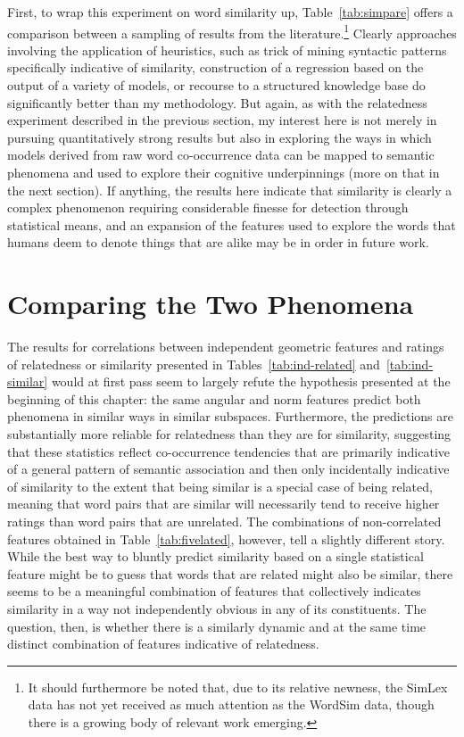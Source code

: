 First, to wrap this experiment on word similarity up, Table~\ref{tab:simpare} offers a comparison between a sampling of results from the literature.\footnote{It should furthermore be noted that, due to its relative newness, the SimLex data has not yet received as much attention as the WordSim data, though there is a growing body of relevant work emerging.}  Clearly approaches involving the application of heuristics, such as  trick of mining syntactic patterns specifically indicative of similarity,  construction of a regression based on the output of a variety of models, or  recourse to a structured knowledge base do significantly better than my methodology.  But again, as with the relatedness experiment described in the previous section, my interest here is not merely in pursuing quantitatively strong results but also in exploring the ways in which models derived from raw word co-occurrence data can be mapped to semantic phenomena and used to explore their cognitive underpinnings (more on that in the next section).  If anything, the results here indicate that similarity is clearly a complex phenomenon requiring considerable finesse for detection through statistical means, and an expansion of the features used to explore the words that humans deem to denote things that are alike may be in order in future work.

\section{Comparing the Two Phenomena} \label{sec:litpare}
The results for correlations between independent geometric features and ratings of relatedness or similarity presented in Tables~\ref{tab:ind-related} and~\ref{tab:ind-similar} would at first pass seem to largely refute the hypothesis presented at the beginning of this chapter: the same angular and norm features predict both phenomena in similar ways in similar subspaces.  Furthermore, the predictions are substantially more reliable for relatedness than they are for similarity, suggesting that these statistics reflect co-occurrence tendencies that are primarily indicative of a general pattern of semantic association and then only incidentally indicative of similarity to the extent that being similar is a special case of being related, meaning that word pairs that are similar will necessarily tend to receive higher ratings than word pairs that are unrelated.  The combinations of non-correlated features obtained in Table~\ref{tab:fivelated}, however, tell a slightly different story.  While the best way to bluntly predict similarity based on a single statistical feature might be to guess that words that are related might also be similar, there seems to be a meaningful combination of features that collectively indicates similarity in a way not independently obvious in any of its constituents.  The question, then, is whether there is a similarly dynamic and at the same time distinct combination of features indicative of relatedness.

